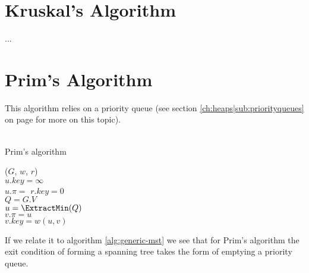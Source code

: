 \newpage
\section{Kruskal's Algorithm}
...


\newpage
\section{Prim's Algorithm}
This algorithm relies on a priority queue (see section
\ref{ch:heaps|sub:priorityqueues} on page \pageref{ch:heaps|sub:priorityqueues}
for more on this topic).
\\\\
\begin{algorithm}[H]
	\caption{Prim's algorithm}
	\label{alg:prim-mst}
	
	
	
	
	
	\BlankLine
	\PrimMST($G$, $w$, $r$) \\
	\Begin
	{
		{
			$u.key = \infty$ \\
			$u.\pi = $ \Nil
		}
		$r.key = 0$ \\
		$Q = G.V$ \\
		
		{
			$u = \ExtractMin(Q)$ \\
			{
				{
					$v.\pi = u$ \\
					$v.key = w(u, v)$
				}
			}
		}
	}
\end{algorithm}
If we relate it to algorithm \ref{alg:generic-mst} we see that for Prim's
algorithm the exit condition of forming a spanning tree takes the form of
emptying a priority queue.


